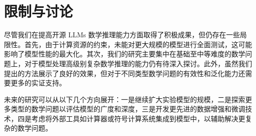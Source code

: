 \section{限制与讨论}
\label{sec:limitation}尽管我们在提高开源 LLMs 数学推理能力方面取得了积极成果，但仍存在一些局限性。首先，由于计算资源的约束，未能对更大规模的模型进行全面测试，这可能影响了模型性能的最大化。其次，我们的研究主要集中在基础至中等难度的数学问题上，对于模型处理高级别复杂数学推理的能力仍有待深入探讨。此外，虽然我们提出的方法展示了良好的效果，但对于不同类型数学问题的有效性和泛化能力还需要更多的实证支持。

未来的研究可以从以下几个方向展开：一是继续扩大实验模型的规模，二是探索更多类型的数学问题以评估模型的广度和深度，三是开发更先进的数据增强和微调技术，四是考虑将外部工具如计算器或符号计算系统集成到模型中，以辅助解决更复杂的数学问题。